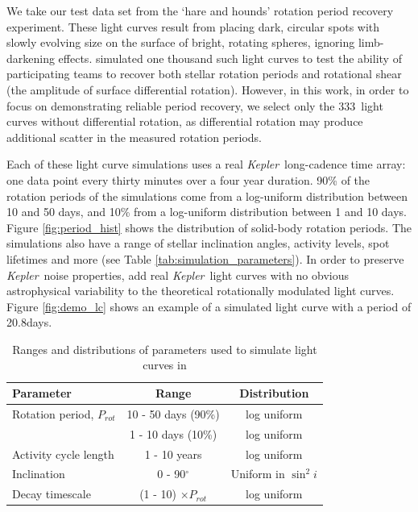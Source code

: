 \documentclass[useAMS, usenatbib, preprint, 12pt]{aastex}
\newcommand{\Kepler}{{\it Kepler}}
\newcommand{\kepler}{\Kepler}
\newcommand{\naigrain}{333}
\newcommand{\aigrainexampleperiod}{20.8}
\begin{document}
We take our test data set from the \citet{Aigrain2015} `hare and hounds'
rotation period recovery experiment.
These light curves result from placing dark, circular spots with slowly
evolving size on the surface of bright, rotating spheres, ignoring
limb-darkening effects.
\citet{Aigrain2015} simulated one thousand such light curves to test the
ability of participating teams to recover both stellar rotation periods
and rotational shear (the amplitude of surface differential rotation).
However, in this work, in order to focus on demonstrating reliable period recovery,
we select only the \naigrain\ light curves without differential rotation,
as differential rotation may produce additional scatter in the
measured rotation periods.

Each of these light curve simulations uses a real \Kepler\ long-cadence time array:
one data point every thirty minutes over a four year duration.
90\% of the rotation periods of the simulations come from a
log-uniform distribution between 10 and 50 days, and 10\% from a log-uniform
distribution between 1 and 10 days.
Figure \ref{fig:period_hist} shows the distribution of solid-body rotation periods.
The simulations also have a range of stellar inclination
angles, activity levels, spot lifetimes and more
(see Table \ref{tab:simulation_parameters}).
In order to preserve \kepler\ noise properties,
\citet{Aigrain2015} add real \kepler\ light curves with no obvious astrophysical
variability to the theoretical rotationally modulated light curves.
Figure \ref{fig:demo_lc} shows an example of a simulated light curve with a
period of \aigrainexampleperiod days.

\begin{table}
\begin{center}
\caption{Ranges and distributions of parameters used to simulate light curves
in \citet{Aigrain2015}}
\begin{tabular}{lcc}
\hline\hline
    Parameter & Range & Distribution \\
    \hline
    Rotation period, $P_{rot}$ & 10 - 50 days (90\%) & log uniform \\
    & 1 - 10 days (10\%) & log uniform \\
    Activity cycle length & 1 - 10 years & log uniform \\
    Inclination & 0 - 90$^\circ$ & Uniform in $\sin^2i$ \\
    Decay timescale & (1 - 10) $\times P_{rot}$ & log uniform \\
\hline
\end{tabular}
\end{center}
\end{table}
\label{tab:simulation_parameters}
\end{document}
